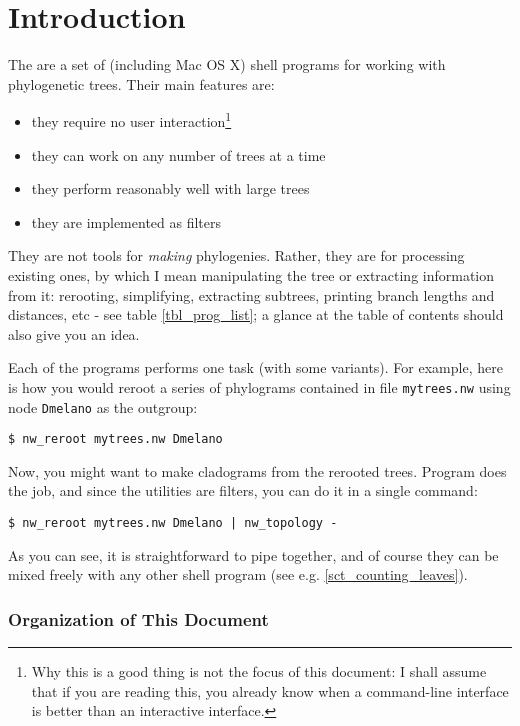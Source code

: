 \clearpage
{}
\chapter*{Introduction}

The \nutils{} are a set of \unix{} (including Mac OS X) shell programs for
working with phylogenetic trees. Their main features are:
\begin{itemize}
 \item they require no user interaction\footnote{Why this is a good thing is not the focus of this document: I shall assume that if you are reading this, you already know when a command-line interface is better than an interactive interface.}
 \item they can work on any number of trees at a time
 \item they perform reasonably well with large trees
 \item they are implemented as filters
\end{itemize}
They are not tools for \emph{making} phylogenies. Rather, they are for
processing existing ones, by which I mean manipulating the tree or extracting
information from it: rerooting, simplifying, extracting subtrees, printing
branch lengths and distances, etc - see table \ref{tbl_prog_list}; a glance
at the table of contents should also give you an idea.

Each of the programs performs one task (with some variants). For example, here
is how you would reroot a series of phylograms contained in file
\texttt{mytrees.nw} using node \texttt{Dmelano} as the outgroup:

\begin{verbatim}
$ nw_reroot mytrees.nw Dmelano
\end{verbatim} 
Now, you might want to make cladograms from the rerooted trees. Program \topology{} does the job, and since the utilities are filters, you can do it in a single command:
\begin{verbatim}
$ nw_reroot mytrees.nw Dmelano | nw_topology -
\end{verbatim}
As you can see, it is straightforward to pipe \nutils{} together, and of course they can be mixed freely with any other shell program (see e.g. \ref{sct_counting_leaves}).

\subsection*{Organization of This Document}

